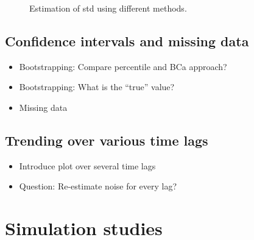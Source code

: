 \documentclass[oneside]{article}
\theoremstyle{plain}%
\theoremstyle{definition}
\begin{document}
\begin{figure}
  \caption{Estimation of std using different methods.}
  \label{fig:estimation std}
\end{figure}


\subsection{Confidence intervals and missing data}


\begin{itemize}
  \item Bootstrapping: Compare percentile and BCa approach?
  \item Bootstrapping: What is the \enquote{true} value?
  \item Missing data
\end{itemize}

\subsection{Trending over various time lags}

\begin{itemize}
    \item Introduce plot over several time lags
    \item Question: Re-estimate noise for every lag? 
\end{itemize}


\section{Simulation studies}


\end{document}
